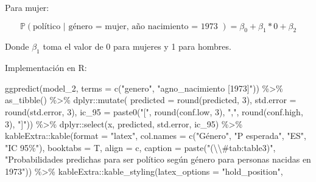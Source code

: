 \documentclass[
  12pt,
  a4paper,
]{article}
\newenvironment{Shaded}{\begin{snugshade}}{\end{snugshade}}
\newcommand{\AttributeTok}[1]{\textcolor[rgb]{0.77,0.63,0.00}{#1}}
\newcommand{\DecValTok}[1]{\textcolor[rgb]{0.00,0.00,0.81}{#1}}
\newcommand{\FunctionTok}[1]{\textcolor[rgb]{0.00,0.00,0.00}{#1}}
\newcommand{\NormalTok}[1]{#1}
\newcommand{\SpecialCharTok}[1]{\textcolor[rgb]{0.00,0.00,0.00}{#1}}
\newcommand{\StringTok}[1]{\textcolor[rgb]{0.31,0.60,0.02}{#1}}
\begin{document}
Para mujer:

\[
\mathbb{P}(\text{político | género = mujer, año nacimiento = 1973 })= \beta_{0} + \beta_{1}*0 + \beta_{2}
\]

Donde \(\beta_{1}\) toma el valor de 0 para mujeres y 1 para hombres.

Implementación en R:

\begin{Shaded}
\begin{Highlighting}[]
\FunctionTok{ggpredict}\NormalTok{(model\_2, }\AttributeTok{terms =} \FunctionTok{c}\NormalTok{(}\StringTok{"genero"}\NormalTok{, }\StringTok{"agno\_nacimiento [1973]"}\NormalTok{)) }\SpecialCharTok{\%\textgreater{}\%} 
  \FunctionTok{as\_tibble}\NormalTok{() }\SpecialCharTok{\%\textgreater{}\%} 
\NormalTok{  dplyr}\SpecialCharTok{::}\FunctionTok{mutate}\NormalTok{(}
        \AttributeTok{predicted =} \FunctionTok{round}\NormalTok{(predicted, }\DecValTok{3}\NormalTok{),}
        \AttributeTok{std.error =} \FunctionTok{round}\NormalTok{(std.error, }\DecValTok{3}\NormalTok{),}
        \AttributeTok{ic\_95 =} \FunctionTok{paste0}\NormalTok{(}\StringTok{"["}\NormalTok{, }\FunctionTok{round}\NormalTok{(conf.low, }\DecValTok{3}\NormalTok{), }\StringTok{","}\NormalTok{, }
                       \FunctionTok{round}\NormalTok{(conf.high, }\DecValTok{3}\NormalTok{), }\StringTok{"]"}\NormalTok{)) }\SpecialCharTok{\%\textgreater{}\%} 
\NormalTok{  dplyr}\SpecialCharTok{::}\FunctionTok{select}\NormalTok{(x, predicted, std.error, ic\_95) }\SpecialCharTok{\%\textgreater{}\%} 
\NormalTok{  kableExtra}\SpecialCharTok{::}\FunctionTok{kable}\NormalTok{(}\AttributeTok{format =} \StringTok{"latex"}\NormalTok{, }
                    \AttributeTok{col.names =} \FunctionTok{c}\NormalTok{(}\StringTok{"Género"}\NormalTok{, }\StringTok{"P esperada"}\NormalTok{, }\StringTok{"ES"}\NormalTok{, }
                                  \StringTok{"IC 95\%"}\NormalTok{),}
                    \AttributeTok{booktabs =}\NormalTok{ T, }
                    \AttributeTok{align =} \StringTok{\textquotesingle{}c\textquotesingle{}}\NormalTok{,}
                    \AttributeTok{caption =} \FunctionTok{paste}\NormalTok{(}\StringTok{"(}\SpecialCharTok{\textbackslash{}\textbackslash{}}\StringTok{\#tab:table3)"}\NormalTok{,}
                                    \StringTok{"Probabilidades predichas para ser político }
\StringTok{                                    según género para personas nacidas en 1973"}\NormalTok{)) }\SpecialCharTok{\%\textgreater{}\%} 
\NormalTok{  kableExtra}\SpecialCharTok{::}\FunctionTok{kable\_styling}\NormalTok{(}\AttributeTok{latex\_options =} \StringTok{"hold\_position"}\NormalTok{, }

\end{Highlighting}
\end{Shaded}
\end{document}
